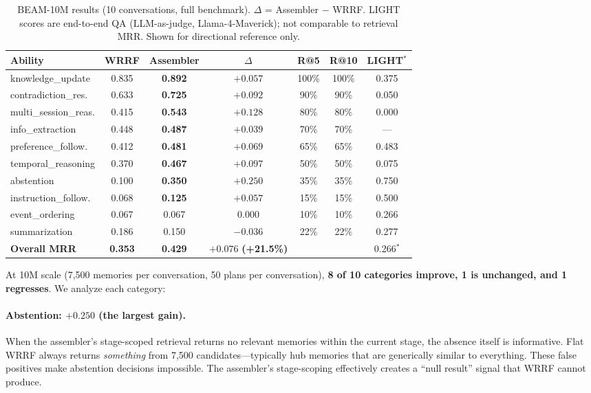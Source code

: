 \documentclass[11pt]{article}
\begin{document}
\begin{table}[t]
\centering
\caption{BEAM-10M results (10 conversations, full benchmark).
  $\Delta$ = Assembler $-$ WRRF.  LIGHT scores are end-to-end QA
  (LLM-as-judge, Llama-4-Maverick); not comparable to retrieval MRR.
  Shown for directional reference only.}
\label{tab:10m}
\small
\begin{tabular}{lcccccc}
\toprule
Ability & WRRF & Assembler & $\Delta$ & R@5 & R@10 & LIGHT$^*$ \\
\midrule
knowledge\_update & 0.835 & \textbf{0.892} & $+0.057$ & 100\% & 100\% & 0.375 \\
contradiction\_res. & 0.633 & \textbf{0.725} & $+0.092$ & 90\% & 90\% & 0.050 \\
multi\_session\_reas. & 0.415 & \textbf{0.543} & $+0.128$ & 80\% & 80\% & 0.000 \\
info\_extraction & 0.448 & \textbf{0.487} & $+0.039$ & 70\% & 70\% & --- \\
preference\_follow. & 0.412 & \textbf{0.481} & $+0.069$ & 65\% & 65\% & 0.483 \\
temporal\_reasoning & 0.370 & \textbf{0.467} & $+0.097$ & 50\% & 50\% & 0.075 \\
abstention & 0.100 & \textbf{0.350} & $+0.250$ & 35\% & 35\% & 0.750 \\
instruction\_follow. & 0.068 & \textbf{0.125} & $+0.057$ & 15\% & 15\% & 0.500 \\
event\_ordering & 0.067 & 0.067 & $0.000$ & 10\% & 10\% & 0.266 \\
summarization & 0.186 & 0.150 & $-0.036$ & 22\% & 22\% & 0.277 \\
\midrule
\textbf{Overall MRR} & \textbf{0.353} & \textbf{0.429} & $\mathbf{+0.076}$ \textbf{(+21.5\%)} & & & 0.266$^*$ \\
\bottomrule
\end{tabular}
\end{table}

At 10M scale (7,500 memories per conversation, 50 plans per
conversation), \textbf{8 of 10 categories improve, 1 is unchanged,
and 1 regresses}.  We analyze each category:

\paragraph{Abstention: $+0.250$ (the largest gain).}
When the assembler's stage-scoped retrieval returns no relevant
memories within the current stage, the absence itself is informative.
Flat WRRF always returns \emph{something} from 7,500
candidates---typically hub memories that are generically similar to
everything.  These false positives make abstention decisions
impossible.  The assembler's stage-scoping effectively creates a
``null result'' signal that WRRF cannot produce.
\end{document}
